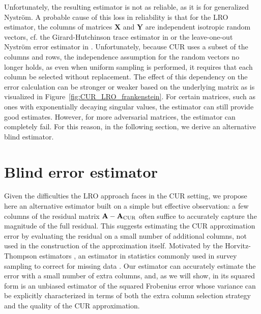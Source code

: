\documentclass[11pt]{article}
\newcommand{\GN}{generalized Nyström}
\newcommand{\Ny}{Nyström}
\newcommand{\curX}{\mathbf{A}_{\textup{CUR}}}
\begin{document}
Unfortunately, the resulting estimator is not as reliable, as it is for \GN{}.
A probable cause of this loss in reliability is that for the LRO estimator, the columns of matrices $\mathbf{X}$ and $\mathbf{Y}$ are independent isotropic random vectors, cf. the Girard-Hutchinson trace estimator in \cite[Section 4.8]{martinssonRandomizedNumericalLinear2020a} or the leave-one-out \Ny{} error estimator in \cite{EpperlyTropp_VarianceEst2024}. Unfortunately, because CUR uses a subset of the columns and rows, the independence assumption for the random vectors no longer holds, as even when uniform sampling is performed, it requires that each column be selected without replacement. The effect of this dependency on the error calculation can be stronger or weaker based on the underlying matrix as is visualized in Figure~\ref{fig:CUR_LRO_frankenstein}.
For certain matrices, such as ones with exponentially decaying singular values, the estimator can still provide good estimates.
However, for more adversarial matrices, the estimator can completely fail.
For this reason, in the following section, we derive an alternative blind estimator.



\section{Blind error estimator}
Given the difficulties the LRO approach faces in the CUR setting, we propose here an alternative estimator built on a simple but effective observation: a few columns of the residual matrix $\mathbf{A} - \curX$ often suffice to accurately capture the magnitude of the full residual.
This suggests estimating the CUR approximation error by evaluating the residual on a small number of additional columns, not used in the construction of the approximation itself. Motivated by the Horvitz-Thompson estimators \cite{horvitz1952generalization}, an estimator in statistics commonly used in survey sampling to correct for missing data \cite{sarndal1992model}. Our estimator can accurately estimate the error with a small number of extra columns, and, as we will show, in its squared form is an unbiased estimator of the squared Frobenius error whose variance can be explicitly characterized in terms of both the extra column selection strategy and the quality of the CUR approximation.
\end{document}
